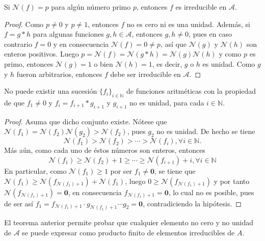 \begin{proposition}
Si $\mathcal{N}(f)=p$ para algún número primo $p$, entonces $f$ es irreducible en $\mathcal{A}$.
\end{proposition}
\begin{proof}
Como $p \ne 0$ y $p \ne 1$, entonces $f$ no es cero ni es una unidad. Además, si $f=g*h$ para algunas funciones $g,h \in \mathcal{A}$, entonces  $g,h \ne 0$,  pues en caso contrario $f=0$ y en consecuencia $\mathcal{N}(f)=0 \ne p$, así que $\mathcal{N}(g)$ y $\mathcal{N}(h)$ son enteros positivos. Luego $p = \mathcal{N}(f) = \mathcal{N}(g*h) = \mathcal{N}(g)\mathcal{N}(h)$ y como $p$ es primo, entonces $\mathcal{N}(g)=1$ o bien $\mathcal{N}(h)=1$, es decir, $g$ o $h$ es unidad. Como $g$ y $h$ fueron arbitrarios, entonces $f$ debe ser irreducible en $\mathcal{A}$.
\end{proof}

\begin{theorem}\label{thm:chain1}
No puede existir una sucesión $\{ f_i \}_{i \in \mathbb{N}}$ de funciones aritméticas con la propiedad de que $f_1 \ne 0$ y $f_i=f_{i+1}*g_{i+1}$ y $g_{i+1}$ no es unidad, para cada $i \in \mathbb{N}$.
\end{theorem}
\begin{proof}
Asuma que dicho conjunto existe. Nótese que $\mathcal{N}(f_1) = \mathcal{N}(f_2) \mathcal{N}(g_2) > \mathcal{N}(f_2)$, pues $g_2$ no es unidad. De hecho se tiene
\begin{equation*}
    \mathcal{N}(f_1) > \mathcal{N}(f_2) > \cdots > \mathcal{N}(f_i), \forall i \in \mathbb{N}.
\end{equation*}
Más aún, como cada uno de éstos números son enteros, entonces
\begin{equation*}
    \mathcal{N}(f_1) \ge \mathcal{N}(f_2) + 1 \ge \cdots \ge \mathcal{N}(f_{i+1}) + i, \forall i \in \mathbb{N}
\end{equation*}
En particular, como $\mathcal{N}(f_1) \ge 1$ por ser $f_1 \ne \mathbf{0}$, se tiene que $\mathcal{N}(f_1) \ge \mathcal{N}\left(f_{\mathcal{N}(f_1)+1}\right) + \mathcal{N}(f_1)$, luego $0 \ge \mathcal{N}\left(f_{\mathcal{N}(f_1)+1}\right)$ y por tanto $\mathcal{N}(f_{\mathcal{N}(f_1)+1}) = \mathbf{0}$, en consecuencia $f_{\mathcal{N}(f_1)+1} = \mathbf{0}$, lo cual no es posible, pues de ser así $f_1 = f_{\mathcal{N}(f_1)+1} \cdot g_{\mathcal{N}(f_1)+1} \cdots g_2 = \mathbf{0}$, contradiciendo la hipótesis.
\end{proof}

El teorema anterior permite probar que cualquier elemento no cero y no unidad de $\mathcal{A}$ se puede expresar como producto finito de elementos irreducibles de $A$.

